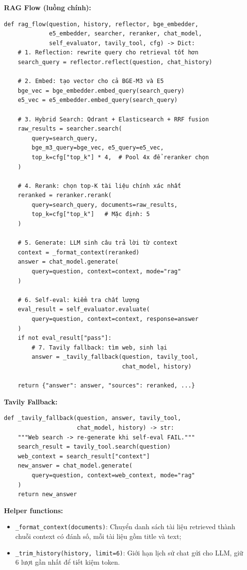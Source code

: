 \documentclass[../DoAn.tex]{subfiles}
\begin{document}
\textbf{RAG Flow (luồng chính):}
\begin{verbatim}
def rag_flow(question, history, reflector, bge_embedder,
             e5_embedder, searcher, reranker, chat_model,
             self_evaluator, tavily_tool, cfg) -> Dict:
    # 1. Reflection: rewrite query cho retrieval tốt hơn
    search_query = reflector.reflect(question, chat_history)

    # 2. Embed: tạo vector cho cả BGE-M3 và E5
    bge_vec = bge_embedder.embed_query(search_query)
    e5_vec = e5_embedder.embed_query(search_query)

    # 3. Hybrid Search: Qdrant + Elasticsearch + RRF fusion
    raw_results = searcher.search(
        query=search_query,
        bge_m3_query=bge_vec, e5_query=e5_vec,
        top_k=cfg["top_k"] * 4,  # Pool 4x để reranker chọn
    )

    # 4. Rerank: chọn top-K tài liệu chính xác nhất
    reranked = reranker.rerank(
        query=search_query, documents=raw_results,
        top_k=cfg["top_k"]   # Mặc định: 5
    )

    # 5. Generate: LLM sinh câu trả lời từ context
    context = _format_context(reranked)
    answer = chat_model.generate(
        query=question, context=context, mode="rag"
    )

    # 6. Self-eval: kiểm tra chất lượng
    eval_result = self_evaluator.evaluate(
        query=question, context=context, response=answer
    )
    if not eval_result["pass"]:
        # 7. Tavily fallback: tìm web, sinh lại
        answer = _tavily_fallback(question, tavily_tool,
                                  chat_model, history)

    return {"answer": answer, "sources": reranked, ...}
\end{verbatim}

\textbf{Tavily Fallback:}
\begin{verbatim}
def _tavily_fallback(question, answer, tavily_tool,
                     chat_model, history) -> str:
    """Web search -> re-generate khi self-eval FAIL."""
    search_result = tavily_tool.search(question)
    web_context = search_result["context"]
    new_answer = chat_model.generate(
        query=question, context=web_context, mode="rag"
    )
    return new_answer
\end{verbatim}

\textbf{Helper functions:}
\begin{itemize}
    \item \texttt{\_format\_context(documents)}: Chuyển danh sách tài liệu retrieved thành chuỗi context có đánh số, mỗi tài liệu gồm title và text;
    \item \texttt{\_trim\_history(history, limit=6)}: Giới hạn lịch sử chat gửi cho LLM, giữ 6 lượt gần nhất để tiết kiệm token.
\end{itemize}
\end{document}
